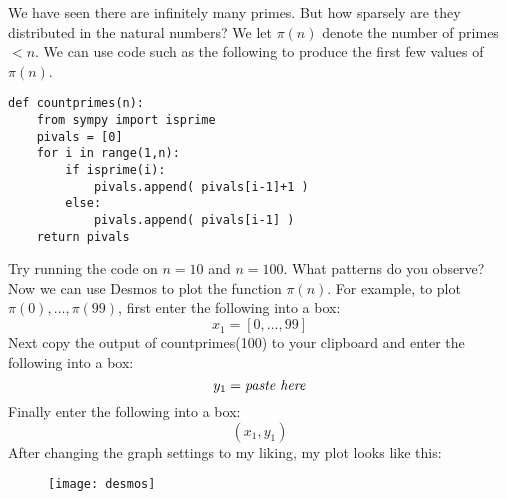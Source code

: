 \documentclass[12pt]{exam}
\begin{document}
\begin{questions}
  \question We have seen there are infinitely many primes. But how sparsely are they distributed in the natural numbers? We let $\pi(n)$ denote the number of primes $<n$. We can use code such as the following to produce the first few values of $\pi(n)$.
  
  \begin{lstlisting}
def countprimes(n):
    from sympy import isprime
    pivals = [0]
    for i in range(1,n):
        if isprime(i):
            pivals.append( pivals[i-1]+1 )
        else:
            pivals.append( pivals[i-1] )
    return pivals
  \end{lstlisting}
  
  Try running the code on $n=10$ and $n=100$. What patterns do you observe?
  \newpage
  \question Now we can use Desmos to plot the function $\pi(n)$. For example, to plot $\pi(0),\ldots,\pi(99)$, first enter the following into a box:
  \[x_1=[0,\ldots,99]
  \]
  Next copy the output of countprimes(100) to your clipboard and enter the following into a box:
  \[y_1=\emph{paste here}
  \]
  Finally enter the following into a box:
  \[(x_1,y_1)
  \]
  After changing the graph settings to my liking, my plot looks like this:
  \begin{figure}[h]
    \centering
    \texttt{[image: desmos]}
  \end{figure}
  
\end{questions}
\end{document}
